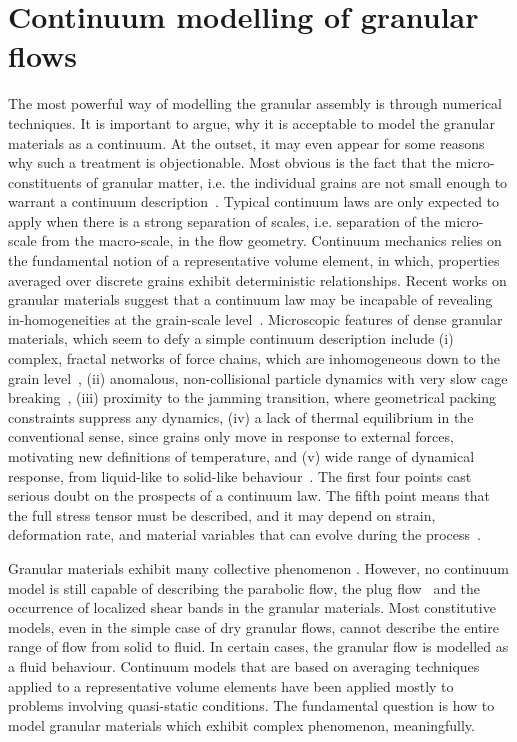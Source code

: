 \section{Continuum modelling of granular flows}

The most powerful way of modelling the granular assembly is through numerical 
techniques. It is important to argue, why it is acceptable to model the 
granular materials as a continuum. At the outset, it may even appear for some 
reasons why such a treatment is objectionable. Most obvious is the fact that 
the micro-constituents of granular matter, i.e. the individual grains are not 
small enough to warrant a continuum description~\citep{Kamrin2007}. Typical 
continuum laws are only expected to apply when there is a strong separation of 
scales, i.e. separation of the micro-scale from the macro-scale, in the flow 
geometry. Continuum mechanics relies on the fundamental notion of a 
representative volume element, in which, properties averaged over discrete 
grains exhibit deterministic relationships. Recent works on granular 
materials suggest that a continuum law may be incapable of revealing 
in-homogeneities at the grain-scale level~\citep{Rycroft2009b}. Microscopic 
features of dense granular materials, which seem to defy a simple continuum
description include (i) complex, fractal networks of force chains, which 
are inhomogeneous down to the grain level~\citep{Goldhirsch2003}, (ii) 
anomalous, non-collisional particle dynamics with very slow cage 
breaking~\citep{Rycroft2006}, (iii) proximity to the jamming transition, where 
geometrical packing constraints suppress any dynamics, (iv) a lack of thermal 
equilibrium in the conventional sense, since grains only move in response to 
external forces, motivating new definitions of temperature, and (v) wide range 
of dynamical response, from liquid-like to solid-like 
behaviour~\citep{Jaeger1996,Aranson2001,Aranson2002}. The first four
points cast serious doubt on the prospects of a continuum law. The fifth point 
means that the full stress tensor must be described, and it may depend on 
strain, deformation rate, and material variables that can evolve during the 
process~\citep{Rycroft2009b}.

Granular materials exhibit many collective phenomenon \citep{Jaeger1996}. 
However, no continuum model is still capable of describing the parabolic flow, 
the plug flow~\citep{Rycroft2006} and the occurrence of localized shear bands 
in the granular materials. Most constitutive models, even in the simple case 
of dry granular flows, cannot describe the entire range of flow from solid to 
fluid. In certain cases, the granular flow is modelled as a fluid behaviour. 
Continuum models that are based on averaging techniques applied to a 
representative volume elements have been applied mostly to problems involving 
quasi-static conditions. The fundamental question is how to model granular 
materials which exhibit complex phenomenon, meaningfully. 


